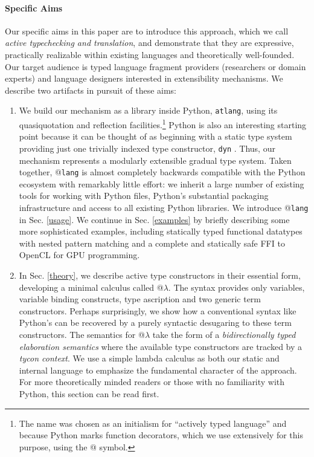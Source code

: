 \documentclass[9pt]{sigplanconf}
\begin{document}
\paragraph{Specific Aims} Our specific aims in this paper are to introduce this approach, which we call \emph{active typechecking and translation}, and demonstrate that they are expressive, practically realizable within existing languages and theoretically well-founded. Our target audience is typed language fragment providers (researchers or domain experts) and language designers interested in extensibility mechanisms. %
We describe two artifacts in pursuit of these aims:
\begin{enumerate}
\item We build our mechanism as a library inside Python, \verb|atlang|,  using its quasiquotation and reflection facilities.\footnote{The name was chosen as an initialism for ``actively  typed language'' and because Python marks function decorators, which we use extensively for this purpose, using the @ symbol.} Python is also an interesting starting point  because it  can be thought of as beginning with a  static type system providing just one trivially indexed type constructor, \texttt{dyn} \cite{pfpl}. Thus, our mechanism represents a modularly extensible gradual type system. Taken together, @\texttt{lang} is almost completely backwards compatible with the Python ecosystem with remarkably little effort: we inherit a large number of  existing tools for working with Python files, Python's substantial packaging infrastructure and access to all existing Python libraries. We introduce @\texttt{lang}  in Sec. \ref{usage}. We continue in Sec. \ref{examples} by briefly describing  some more sophisticated examples, including statically typed functional datatypes with nested pattern matching and a complete and statically safe FFI to OpenCL for GPU programming.
\item In Sec. \ref{theory}, we describe active type constructors in their essential form, developing a minimal calculus called @$\lambda$. The syntax provides only variables, variable binding constructs, type ascription and two generic term constructors. Perhaps surprisingly, we show how a conventional syntax like Python's can be recovered by a purely syntactic desugaring to these term constructors. The semantics for @$\lambda$ take the form of a \emph{bidirectionally typed elaboration semantics} where the available type constructors are tracked by a \emph{tycon context}. We use a simple lambda calculus as both our static and internal language to emphasize the fundamental character of the approach. For more theoretically minded readers or those with no familiarity with Python, this section can be read first.
\end{enumerate}
\end{document}
